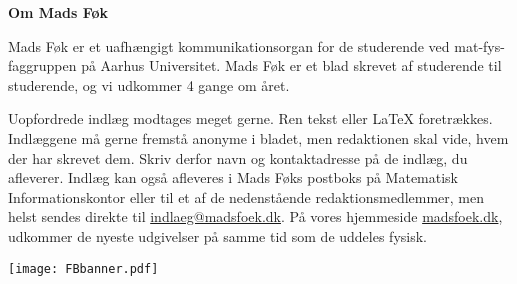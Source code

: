 \noindent\textbf{Om Mads Føk}

\noindent Mads Føk er et uafhængigt kommunikationsorgan for de studerende ved
mat-fys-faggruppen på Aarhus Universitet. Mads Føk er et blad skrevet
af studerende til studerende, og vi udkommer 4 gange om året.
\vspace{1mm}

Uopfordrede indlæg modtages meget gerne. Ren tekst eller \LaTeX\xspace
foretrækkes. Indlæggene må gerne fremstå anonyme i bladet, men redaktionen skal
vide, hvem der har skrevet dem. Skriv derfor navn og kontaktadresse på de
indlæg, du afleverer. Indlæg kan også afleveres i Mads Føks postboks på
Matematisk Informationskontor eller til et af de nedenstående redaktionsmedlemmer,
men helst sendes direkte til \url{indlaeg@madsfoek.dk}.
På vores hjemmeside \url{madsfoek.dk}, udkommer de nyeste udgivelser på samme
tid som de uddeles fysisk.

\texttt{[image: FBbanner.pdf]}
\vspace{-10mm}

